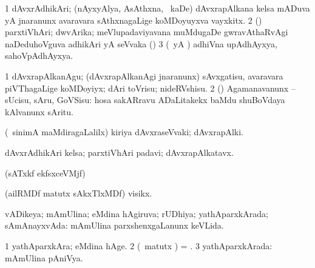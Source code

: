 {{{\bentry
{} 
\gl{\nA}
\expl{}
\bmng
\bnum
\num{1} dAvxrAdhikAri; (nAyxyAlya, AsAthxna, \mo\ kaDe) dAvxrapAlkana kelsa mADuva yA jnaranunx avaravara sAthxnagaLige koMDoyuyxva vayxkitx. 
\num{2} (\birx) parxtiVhAri; dwvArika; meVlupadaviyavana muMdugaDe gwravAthaRvAgi naDeduhoVguva adhikAri yA seVvaka () 
\num{3} (\pArxparx\ yA \hA) adhiVna upAdhAyxya, sahoVpAdhAyxya. 
\enum
\emng
\eentry

\bentry
{} 
\gl{\sakirx}
\expl{}
\bmng
\bnum
\num{1} dAvxrapAlkanAgu; (dAvxrapAlkanAgi jnaranunx) sAvxgatisu, avaravara piVThagaLige koMDoyiyx; dAri toVrisu; nideRVshisu. 
\num{2} (\rUpa) Agamanavanunx -- sUcisu, sAru, GoVSisu:  hosa sakARravu ADaLitakekx baMdu shuBoVdaya kAlvanunx sAritu. 
\enum
\emng
\eentry

\bentry
{} 
\gl{\nA}
\expl{}
\bmng
(\kanmu\ sinimA maMdiragaLalilx) kiriya dAvxraseVvaki; dAvxrapAlki. 
\emng
\eentry

\bentry
{} 
\gl{\nA}
\expl{}
\bmng
dAvxrAdhikAri kelsa; parxtiVhAri padavi; dAvxrapAlkatavx. 
\emng
\eentry

\bentry
{}
\gl{\saMkiSx}
\expl{}
\bmng
(sATxkf ekfsxceVMjf)  
\emng
\eentry

\bentry
{}
\gl{\saMkiSx}
\expl{}
\bmng
{} 
\emng
\eentry

\bentry
{} 
\gl{\nA}
\expl{}
\bmng
(ailRMDf matutx sAkxTlxMDf) visikx. 
\emng
\eentry

\bentry
{}
\gl{\saMkiSx}
\expl{}
\bmng
{} 
\emng
\eentry

\bentry
{}
\gl{\saMkiSx}
\expl{}
\bmng
{} 
\emng
\eentry

\bentry
{} 
\gl{\gu}
\bmng
vADikeya; mAmUlina; eMdina hAgiruva; rUDhiya; yathAparxkArada; sAmAnayxvAda:  mAmUlina parxshenxgaLanunx keVLida. 
\emng

\noindent
\gl{\pagu}
\expl{}
\bmng
\hypertarget{usual pagu1}{} 
\bnum
\num{1}  yathAparxkAra; eMdina hAge. 
\num{2}  (\gArx\ matutx \hA) = \hyperlink{usual pagu1}{\pagu {}}. 
\num{3}  yathAparxkArada:  mAmUlina pAniVya. 
\enum
\emng
\eentry

}}}

